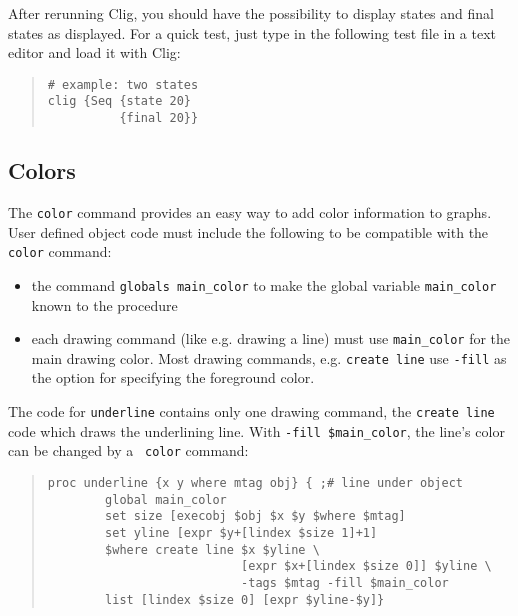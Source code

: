 After rerunning {\sc Clig}, you should have the possibility to display
states and final states as displayed. For a quick test, just type in the
following test file in a text editor and load it with {\sc Clig}:

\begin{quote}
\begin{verbatim}
# example: two states
clig {Seq {state 20}
          {final 20}}
\end{verbatim}
\end{quote}

\subsection{Colors}

The {\tt color} command provides an easy way to add color information
to graphs. User defined object code must include the following to be
compatible with the {\tt color} command:

\begin{itemize}
\item the command \verb'globals main_color' to make the global variable
\verb'main_color' known to the procedure
\item each drawing command (like e.g. drawing a line) must use
\verb'main_color' for the main drawing color. Most drawing commands,
e.g.  {\tt create line} use {\tt -fill} as the option for specifying
the foreground color.
\end{itemize}

The code for {\tt underline} contains only one drawing command, the
{\tt create line} code which draws the underlining line. With 
\verb'-fill $main_color', the line's color can be changed by a {\tt
color} command:

\begin{quote}
\begin{verbatim}
proc underline {x y where mtag obj} { ;# line under object
        global main_color
        set size [execobj $obj $x $y $where $mtag]
        set yline [expr $y+[lindex $size 1]+1]
        $where create line $x $yline \
                           [expr $x+[lindex $size 0]] $yline \
                           -tags $mtag -fill $main_color
        list [lindex $size 0] [expr $yline-$y]}
\end{verbatim}
\end{quote}
 

